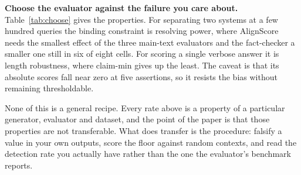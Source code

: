 \textbf{Choose the evaluator against the failure you care about.} Table~\ref{tab:choose} gives the properties. For separating two systems at a few hundred queries the binding constraint is resolving power, where AlignScore needs the smallest effect of the three main-text evaluators and the fact-checker a smaller one still in six of eight cells. For scoring a single verbose answer it is length robustness, where claim-min gives up the least. The caveat is that its absolute scores fall near zero at five assertions, so it resists the bias without remaining thresholdable.

None of this is a general recipe. Every rate above is a property of a particular generator, evaluator and dataset, and the point of the paper is that those properties are not transferable. What does transfer is the procedure: falsify a value in your own outputs, score the floor against random contexts, and read the detection rate you actually have rather than the one the evaluator's benchmark reports.
